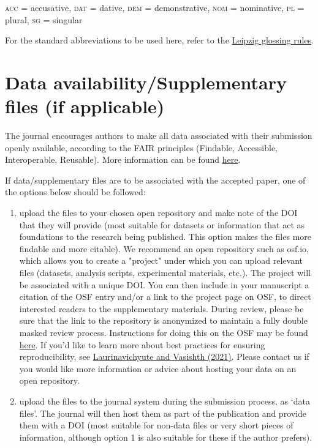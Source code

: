 \documentclass[times,linguex,xcolor]{glossa}
\begin{document}
\textsc{acc} = accusative, \textsc{dat} = dative, \textsc{dem} = demonstrative, \textsc{nom} = nominative, \textsc{pl} = plural, \textsc{sg} = singular

For the standard abbreviations to be used here, refer to the \href{https://www.eva.mpg.de/lingua/resources/glossing-rules.php}{Leipzig glossing rules}.

\section*{Data availability/Supplementary files (if applicable)}

The journal encourages authors to make all data associated with their submission openly available, according to the FAIR principles (Findable, Accessible, Interoperable, Reusable). More information can be found \href{https://www.glossa-journal.org/site/editorial-policies/#data-policy}{here}.

If data/supplementary files are to be associated with the accepted paper, one of the options below should be followed:
\begin{enumerate}
\item upload the files to your chosen open repository and make note of the DOI that they will provide (most suitable for datasets or information that act as foundations to the research being published. This option makes the files more findable and more citable). We recommend an open repository such as osf.io, which allows you to create a "project" under which you can upload relevant files (datasets, analysis scripts, experimental materials, etc.). The project will be associated with a unique DOI. You can then include in your manuscript a citation of the OSF entry and/or a link to the project page on OSF, to direct interested readers to the supplementary materials. During review, please be sure that the link to the repository is anonymized to maintain a fully double masked review process. Instructions for doing this on the OSF may be found \href{https://help.osf.io/hc/en-us/articles/360019930333-Create-a-View-only-Link-for-a-Project}{here}. If you'd like to learn more about best practices for ensuring reproducibility, see \href{https://psyarxiv.com/hf297/}{Laurinavichyute and Vasishth (2021)}. Please contact us if you would like more information or advice about hosting your data on an open repository.
\item upload the files to the journal system during the submission process, as `data files'. The journal will then host them as part of the publication and provide them with a DOI (most suitable for non-data files or very short pieces of information, although option 1 is also suitable for these if the author prefers).
\end{enumerate}
\end{document}
